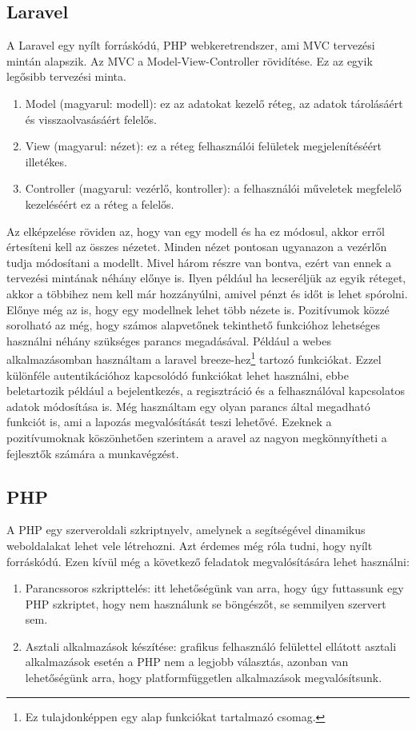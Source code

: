 \documentclass[]{thesis-ekf}
\theoremstyle{definition}
\theoremstyle{remark}
\begin{document}
	\subsection{Laravel}\label{sc-laravel}
		A Laravel egy nyílt forráskódú, PHP webkeretrendszer, ami MVC tervezési mintán alapszik. Az MVC a Model-View-Controller rövidítése. Ez az egyik legősibb tervezési minta.
		\begin{enumerate}
			\item Model (magyarul: modell): ez az adatokat kezelő réteg, az adatok tárolásáért és visszaolvasásáért felelős.
			\item View (magyarul: nézet): ez a réteg felhasználói felületek megjelenítéséért illetékes. 
			\item Controller (magyarul: vezérlő, kontroller): a felhasználói műveletek megfelelő kezeléséért ez a réteg a felelős.
		\end{enumerate}
		Az elképzelése röviden az, hogy van egy modell és ha ez módosul, akkor erről értesíteni kell az összes nézetet. Minden nézet pontosan ugyanazon a vezérlőn tudja módosítani a modellt. Mivel három részre van bontva, ezért van ennek a tervezési mintának néhány előnye is. Ilyen például ha lecseréljük az egyik réteget, akkor a többihez nem kell már hozzányúlni, amivel pénzt és időt is lehet spórolni. Előnye még az is, hogy egy modellnek lehet több nézete is. Pozitívumok közzé sorolható az még, hogy számos alapvetőnek tekinthető funkcióhoz lehetséges használni néhány szükséges parancs megadásával. Például a webes alkalmazásomban használtam a laravel breeze-hez\footnote{Ez tulajdonképpen egy alap funkciókat tartalmazó csomag.} tartozó funkciókat. Ezzel különféle autentikációhoz kapcsolódó funkciókat lehet használni, ebbe beletartozik például a bejelentkezés, a regisztráció és a felhasználóval kapcsolatos adatok módosítása is. Még használtam egy olyan parancs által megadható funkciót is, ami a lapozás megvalósítását teszi lehetővé. Ezeknek a pozitívumoknak köszönhetően szerintem a aravel az nagyon megkönnyítheti a fejlesztők számára a munkavégzést. 
		\cite{Kusper, Laravel}
	\subsection{PHP}
		A PHP egy szerveroldali szkriptnyelv, amelynek a segítségével dinamikus weboldalakat lehet vele létrehozni. Azt érdemes még róla tudni, hogy nyílt forráskódú. Ezen kívül még a következő feladatok megvalósítására lehet használni:
		\begin{enumerate}
			\item Parancssoros szkripttelés: itt lehetőségünk van arra, hogy úgy futtassunk egy PHP szkriptet, hogy nem használunk se böngészőt, se semmilyen szervert sem.
			\item Asztali alkalmazások készítése: grafikus felhasználó felülettel ellátott asztali alkalmazások esetén a PHP nem a legjobb választás, azonban van lehetőségünk arra, hogy platformfüggetlen alkalmazások megvalósítsunk.
		\end{enumerate}
		\cite{PHP}
\end{document}
